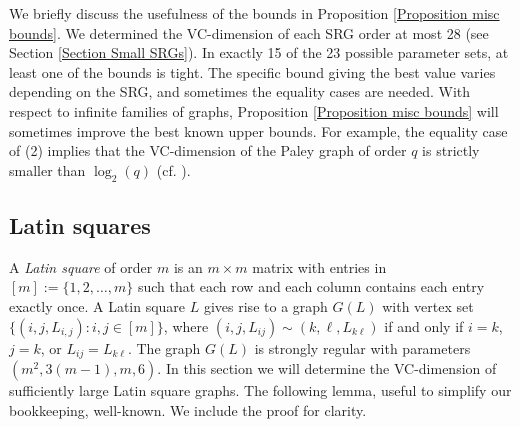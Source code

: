 \documentclass{article}
\theoremstyle{definition}
\begin{document}
We briefly discuss the usefulness of the bounds in Proposition \ref{Proposition misc bounds}. We determined the VC-dimension of each SRG order at most 28 (see Section \ref{Section Small SRGs}). In exactly 15 of the 23 possible parameter sets, at least one of the bounds is tight. The specific bound giving the best value varies depending on the SRG, and sometimes the equality cases are needed. With respect to infinite families of graphs, Proposition \ref{Proposition misc bounds} will sometimes improve the best known upper bounds. For example, the equality case of (2) implies that the VC-dimension of the Paley graph of order $q$ is strictly smaller than $\log_2(q)$ (cf. \cite{mcdonald2025vc}).
    
\subsection{Latin squares} \label{Section Latin Squares}

A \textit{Latin square} of order $m$ is an $m\times m$ matrix with entries in $[m]:=\{1,2,\ldots,m\}$ such that each row and each column contains each entry exactly once. A Latin square $L$ gives rise to a graph $G(L)$ with vertex set $\{(i,j,L_{i,j}):i,j\in[m]\}$, where $(i,j,L_{ij})\sim(k,\ell,L_{k\ell})$ if and only if $i=k$, $j=k$, or $L_{ij}=L_{k\ell}$. The graph $G(L)$ is strongly regular with parameters $(m^2,3(m-1),m,6)$. In this section we will determine the VC-dimension of sufficiently large Latin square graphs. The following lemma, useful to simplify our bookkeeping, well-known. We include the proof for clarity.
\end{document}
